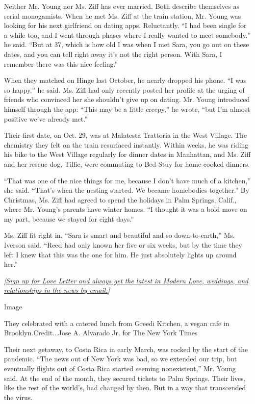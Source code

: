 Neither Mr. Young nor Ms. Ziff has ever married. Both describe
themselves as serial monogamists. When he met Ms. Ziff at the train
station, Mr. Young was looking for his next girlfriend on dating apps.
Reluctantly. ``I had been single for a while too, and I went through
phases where I really wanted to meet somebody,'' he said. ``But at 37,
which is how old I was when I met Sara, you go out on these dates, and
you can tell right away it's not the right person. With Sara, I remember
there was this nice feeling.''

When they matched on Hinge last October, he nearly dropped his phone.
``I was so happy,'' he said. Ms. Ziff had only recently posted her
profile at the urging of friends who convinced her she shouldn't give up
on dating. Mr. Young introduced himself through the app: ``This may be a
little creepy,'' he wrote, ``but I'm almost positive we've already
met.''

Their first date, on Oct. 29, was at Malatesta Trattoria in the West
Village. The chemistry they felt on the train resurfaced instantly.
Within weeks, he was riding his bike to the West Village regularly for
dinner dates in Manhattan, and Ms. Ziff and her rescue dog, Tillie, were
commuting to Bed-Stuy for home-cooked dinners.

``That was one of the nice things for me, because I don't have much of a
kitchen,'' she said. ``That's when the nesting started. We became
homebodies together.'' By Christmas, Ms. Ziff had agreed to spend the
holidays in Palm Springs, Calif., where Mr. Young's parents have winter
homes. ``I thought it was a bold move on my part, because we stayed for
eight days.''

Ms. Ziff fit right in. ``Sara is smart and beautiful and so
down-to-earth,'' Ms. Iverson said. ``Reed had only known her five or six
weeks, but by the time they left I knew that this was the one for him.
He just absolutely lights up around her.''

\emph{{[}}\href{https://www.nytimes3xbfgragh.onion/newsletters/love-letter?module=inline}{\emph{Sign
up for Love Letter and always get the latest in Modern Love, weddings,
and relationships in the news by email.}}\emph{{]}}

Image

They celebrated with a catered lunch from Greedi Kitchen, a vegan cafe
in Brooklyn.Credit...Jose A. Alvarado Jr. for The New York Times

Their next getaway, to Costa Rica in early March, was rocked by the
start of the pandemic. ``The news out of New York was bad, so we
extended our trip, but eventually flights out of Costa Rica started
seeming nonexistent,'' Mr. Young said. At the end of the month, they
secured tickets to Palm Springs. Their lives, like the rest of the
world's, had changed by then. But in a way that transcended the virus.

